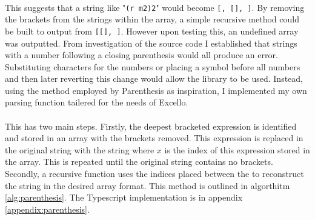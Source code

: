 \paragraph{} This suggests that a string like "\texttt{(r m2)2}" would become \texttt{[\upquote{(}, [], ]}.  By removing the brackets from the strings within the array, a simple recursive method could be built to output \texttt{} from \texttt{[[], ]}. However upon testing this, an undefined array was outputted. From investigation of the source code I established that strings with a number following a closing parenthesis would all produce an error. Substituting characters for the numbers or placing a symbol before all numbers and then later reverting this change would allow the library to be used. Instead, using the method employed by Parenthesis as inspiration, I implemented my own parsing function tailered for the needs of Excello.

\paragraph{} This has two main steps. Firstly, the deepest bracketed expression is identified and stored in an array with the brackets removed. This expression is replaced in the original string with the string  where $x$ is the index of this expression stored in the array. This is repeated until the original string contains no brackets. Secondly, a recursive function uses the indices placed between the \texttt{\upquote{\_\_\_}} to reconstruct the string in the desired array format. This method is outlined in algorthitm \ref{alg:parenthesis}. The Typescript implementation is in appendix \ref{appendix:parenthesis}.

